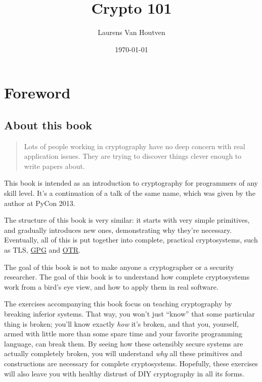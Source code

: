\documentclass[11pt,ebook,table,dvipsnames]{memoir}
\author{Laurens Van Houtven}
\date{\today}
\title{Crypto 101}
\begin{document}
\maketitle
\tableofcontents

\OnehalfSpacing

\part{Foreword}
\label{sec-1}
\chapter{About this book}
\label{sec-1-1}

\begin{quotation}
Lots of people working in cryptography have no deep concern with real
application issues. They are trying to discover things clever enough to write
papers about.
\end{quotation}

This book is intended as an introduction to cryptography for
programmers of any skill level. It's a continuation of a talk of the
same name, which was given by the author at PyCon 2013.

The structure of this book is very similar: it starts with very simple
primitives, and gradually introduces new ones, demonstrating why
they're necessary. Eventually, all of this is put together into
complete, practical cryptosystems, such as TLS, \hyperref[GPG]{GPG} and \hyperref[OTR]{OTR}.

The goal of this book is not to make anyone a cryptographer or a
security researcher. The goal of this book is to understand how
complete cryptosystems work from a bird's eye view, and how to apply
them in real software.

The exercises accompanying this book focus on teaching cryptography by
breaking inferior systems. That way, you won't just \enquote{know} that some
particular thing is broken; you'll know exactly \emph{how} it's broken, and
that you, yourself, armed with little more than some spare time and
your favorite programming language, can break them. By seeing how
these ostensibly secure systems are actually completely broken, you
will understand \emph{why} all these primitives and constructions are
necessary for complete cryptosystems. Hopefully, these exercises will
also leave you with healthy distrust of DIY cryptography in all its
forms.
\end{document}
